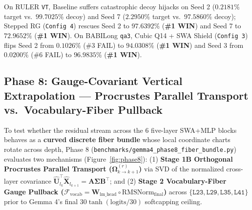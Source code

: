 \documentclass[11pt,letterpaper]{article}
\theoremstyle{definition}
\begin{document}
On RULER \texttt{VT}, Baseline suffers catastrophic decoy hijacks on Seed 2 ($0.2181\%$ target vs.\ $99.7025\%$ decoy) and Seed 7 ($2.2950\%$ target vs.\ $97.5860\%$ decoy); Stepped RG (\texttt{Config 4}) rescues Seed 2 to $\mathbf{97.6392\%}$ (\textbf{\#1 WIN}) and Seed 7 to $\mathbf{72.9652\%}$ (\textbf{\#1 WIN}). On BABILong \texttt{qa3}, Cubic Q14 + SWA Shield (\texttt{Config 3}) flips Seed 2 from $0.1026\%$ (\#3 FAIL) to $\mathbf{94.0308\%}$ (\textbf{\#1 WIN}) and Seed 3 from $0.0200\%$ (\#6 FAIL) to $\mathbf{96.9835\%}$ (\textbf{\#1 WIN}).

\begin{table}[!htbp]
\centering
\caption{Phase 7B ``Lost in the Middle'' Multi-Document Depth Sweep ($15\%$ to $75\%$ Document Depth).}
\label{tab:phase7b}
\vspace{2pt}
\end{table}

\subsection{Phase 8: Gauge-Covariant Vertical Extrapolation --- Procrustes Parallel Transport vs.\ Vocabulary-Fiber Pullback}

To test whether the residual stream across the 6 five-layer SWA+MLP blocks behaves as a \textbf{curved discrete fiber bundle} whose local coordinate charts rotate across depth, Phase 8 (\texttt{benchmarks/gemma4\_phase8\_fiber\_bundle.py}) evaluates two mechanisms (Figure~\ref{fig:phase8}): (1) \textbf{Stage 1B Orthogonal Procrustes Parallel Transport ($\mathbf{\Omega}_{k \to k+1}^{(r)}$)} via SVD of the normalized cross-layer covariance $\hat{\mathbf{U}}_{l_k}^\top \hat{\mathbf{X}}_{l_{k+1}} = \mathbf{A}\mathbf{\Sigma}\mathbf{B}^\top$; and (2) \textbf{Stage 2 Vocabulary-Fiber Gauge Pullback ($\mathcal{F}_{\text{vocab}} = \mathbf{W}_{\text{lm\_head}} \circ \text{RMSNorm}_{\text{final}}$)} across $\{\texttt{L23}, \texttt{L29}, \texttt{L35}, \texttt{L41}\}$ prior to Gemma 4's final $30 \tanh(\text{logits}/30)$ softcapping ceiling.
\end{document}
